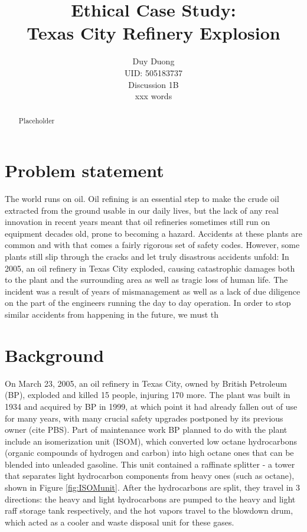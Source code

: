 \documentclass[12pt]{article}
\begin{document}
		\title{Ethical Case Study: \\Texas City Refinery Explosion}

	\author{Duy Duong\\UID: 505183737\\Discussion 1B\\xxx words}
	\maketitle
	
	\begin{abstract}
Placeholder
	\end{abstract}
	\setlength{\parskip}{1em}
	\section*{Problem statement}
	The world runs on oil. Oil refining is an essential step to make the crude oil extracted from the ground usable in our daily lives, but the lack of any real innovation in recent years meant that oil refineries sometimes still run on equipment decades old, prone to becoming a hazard. Accidents at these plants are common and with that comes a fairly rigorous set of safety codes. However, some plants still slip through the cracks and let truly disastrous accidents unfold: In 2005, an oil refinery in Texas City exploded, causing catastrophic damages both to the plant and the surrounding area as well as tragic loss of human life. The incident was a result of years of mismanagement as well as a lack of due diligence on the part of the engineers running the day to day operation. In order to stop similar accidents from happening in the future, we must th
	\section*{Background}
	
	On March 23, 2005, an oil refinery in Texas City, owned by British Petroleum (BP), exploded and killed 15 people, injuring 170 more. The plant was built in 1934 and acquired by BP in 1999, at which point it had already fallen out of use for many years, with many crucial safety upgrades postponed by its previous owner (cite PBS). Part of maintenance work BP planned to do with the plant include an isomerization unit (ISOM), which converted low octane hydrocarbons (organic compounds of hydrogen and carbon) into high octane ones that can be blended into unleaded gasoline. This unit contained a raffinate splitter - a tower that separates light hydrocarbon components from heavy ones (such as octane), shown in Figure \ref{fig:ISOMunit}. After the hydrocarbons are split, they travel in 3 directions: the heavy and light hydrocarbons are pumped to the heavy and light raff storage tank respectively, and the hot vapors travel to the blowdown drum, which acted as a cooler and waste disposal unit for these gases.
	
\end{document}
